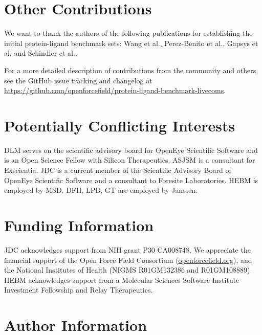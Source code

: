 \documentclass[9pt,bestpractices,pubversion]{livecoms}
\newcommand{\githubrepository}{\href{https://github.com/openforcefield/protein-ligand-benchmark-livecoms}{https://github.com/openforcefield/protein-ligand-benchmark-livecoms}}  %
\begin{document}
\section{Other Contributions}
%

We want to thank the authors of the following publications for establishing the initial protein-ligand benchmark sets: Wang et al.\cite{wang_accurate_2015}, Perez-Benito et al.\cite{perez-benito_predicting_2019}, Gapsys et al.\cite{gapsys_large_2020} and Schindler et al.\cite{schindler_largescale_2020}.

For a more detailed description of contributions from the community and others, see the GitHub issue tracking and changelog at \githubrepository.

\section{Potentially Conflicting Interests}

DLM serves on the scientific advisory board for OpenEye Scientific Software and is an Open Science Fellow with Silicon Therapeutics.
ASJSM is a consultant for Exscientia.
JDC is a current member of the Scientific Advisory Board of OpenEye Scientific Software and a consultant to Foresite Laboratories.
HEBM is employed by MSD. DFH, LPB, GT are employed by Janssen. 

\section{Funding Information}
JDC acknowledges support from NIH grant P30 CA008748.
We appreciate the financial support of the Open Force Field Consortium (\href{https://openforcefield.org}{openforcefield.org}), and the National Institutes of Health (NIGMS R01GM132386 and R01GM108889).
HEBM acknowledges support from a Molecular Sciences Software Institute Investment Fellowship and Relay Therapeutics.


\section*{Author Information}
\makeorcid




\end{document}
